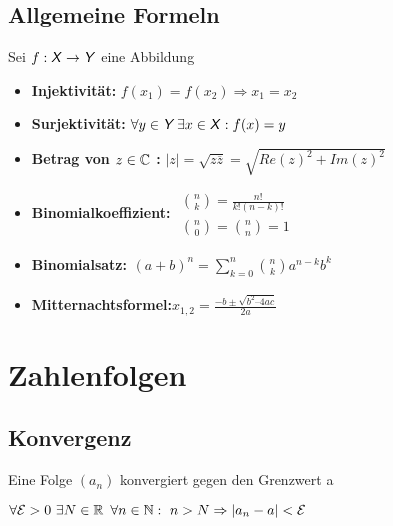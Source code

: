\documentclass[german]{latex4ei/latex4ei_sheet}
\begin{document}
\begin{sectionbox}
	\subsection{Allgemeine Formeln}
	Sei $f:\operatorname{\textsf{\textit{X}}} \rightarrow \operatorname{\textsf{\textit{Y}}}$ eine Abbildung
	\begin{itemize}
	\item \textbf{Injektivität: } $f(x_1)=f(x_2) \Rightarrow x_1=x_2$
	\item \textbf{Surjektivität: } $\forall y \in \operatorname{\textsf{\textit{Y}}} \exists x \in \operatorname{\textsf{\textit{X}}} : f(x)=y$
	\item  \textbf{Betrag von $z \in \mathbb C$ :  } $|z|= \sqrt{z \overline{z}}= \sqrt{Re(z)^2+Im(z)^2}$
		\item \textbf{Binomialkoeffizient:} \begin{math}\begin{array}{l}
	\binom{n}{k} = \frac{n!}{k!(n-k)!}  \\
	\binom{n}{0} = \binom{n}{n} = 1
\end{array}\end{math}\\ 
\item \textbf{Binomialsatz:}\begin{math}\begin{array}{l}
	(a+b)^n = \sum\limits_{k = 0}^{n} \binom{n}{k} a^{n-k} b^{k}
\end{array}\end{math}

\item \textbf{Mitternachtsformel:}$x_{1,2} =   \frac{- b \pm \sqrt{b^{2} \text{--} 4ac}}{2a}$
	\end{itemize}

\end{sectionbox}




\section{Zahlenfolgen}


\begin{sectionbox}
	\subsection{Konvergenz}
	Eine Folge $(a_n)$ konvergiert gegen den Grenzwert a

		
	
	$\forall\mathcal{E}>0 \text{ }\exists N \in \operatorname{\mathbb R} \text{ }\forall n \in \operatorname{\mathbb N}:\text{ } n>N \Rightarrow |a_n - a|<\mathcal{E}$

	
	
	
	
\end{sectionbox}
\end{document}
